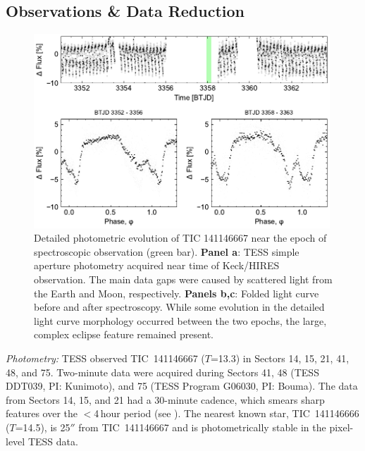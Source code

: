 \documentclass{nature3}
\begin{document}
\newpage
\begin{methods}

\renewcommand{\figurename}{Extended Data Figure}
\renewcommand{\tablename}{Extended Data Table}
\setcounter{table}{0}  
\setcounter{figure}{0}  

\subsection{Observations \& Data Reduction}

\begin{figure}[!b]
  \centering
  \includegraphics[width=0.99\textwidth]{figures/sf1.pdf}
  \caption{Detailed photometric evolution of TIC 141146667 near the
  epoch of spectroscopic observation (green bar). 
  {\bf Panel a}: TESS simple aperture photometry acquired
  near time of Keck/HIRES observation.  The main data gaps were caused
  by scattered light from the Earth and Moon, respectively.
  {\bf Panels b,c}: Folded light curve before and after spectroscopy.
  While some evolution in the detailed light curve morphology occurred
  between the two epochs, the large, complex eclipse feature remained
  present.
  }
  \label{fig:fulllc}
\end{figure}

{\it Photometry:} TESS observed
TIC~141146667 ($T$=13.3) in Sectors 14, 15, 21, 41, 48, and 75.
Two-minute data were acquired during Sectors 41, 48 (TESS DDT039,
PI: Kunimoto), and 75 (TESS Program G06030, PI: Bouma).  The data
from Sectors 14, 15, and 21 had a 30-minute cadence, which
smears sharp features over the $<$4\,hour period
(see \cite{Gunther2022}).  The nearest known star, TIC~141146666
($T$=14.5), is 25$''$ from TIC~141146667 and is photometrically stable
in the pixel-level TESS data.


\end{methods}
\end{document}
